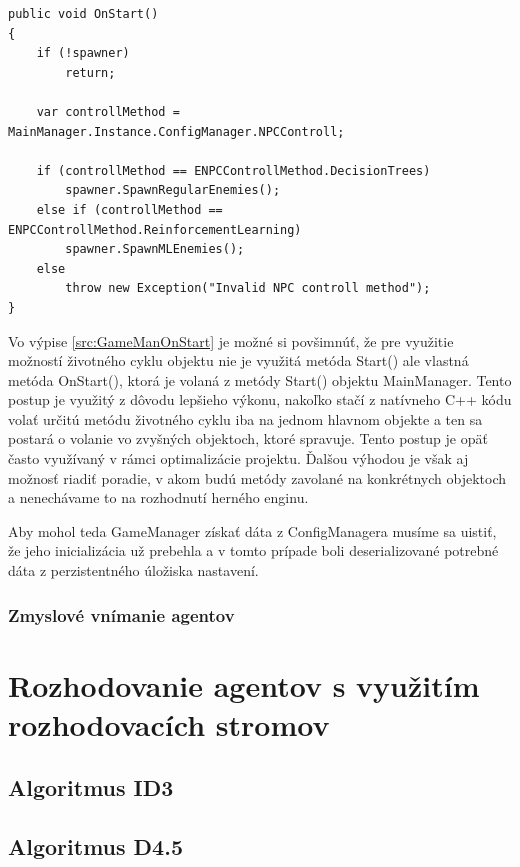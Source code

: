 \documentclass[slovak, master]{diploma}
\begin{document}
\vspace{8pt}
\begin{lstlisting}[label=src:GameManOnStart,caption={Inštancovanie NPC agentov na základe nastavení}]
public void OnStart() 
{
    if (!spawner)
        return;

    var controllMethod = MainManager.Instance.ConfigManager.NPCControll;

    if (controllMethod == ENPCControllMethod.DecisionTrees)
        spawner.SpawnRegularEnemies();
    else if (controllMethod == ENPCControllMethod.ReinforcementLearning)
        spawner.SpawnMLEnemies();
    else
        throw new Exception("Invalid NPC controll method");
}
\end{lstlisting}

Vo výpise \ref{src:GameManOnStart} je možné si povšimnúť, že pre využitie možností životného cyklu objektu nie je využitá metóda Start() ale vlastná metóda OnStart(), ktorá je volaná z metódy Start() objektu MainManager. Tento postup je využitý z dôvodu lepšieho výkonu, nakoľko stačí z natívneho C++ kódu volať určitú metódu životného cyklu iba na jednom hlavnom objekte a ten sa postará o volanie vo zvyšných objektoch, ktoré spravuje. Tento postup je opäť často využívaný v rámci optimalizácie projektu. Ďalšou výhodou je však aj možnosť riadiť poradie, v akom budú metódy zavolané na konkrétnych objektoch a nenechávame to na rozhodnutí herného enginu. 

Aby mohol teda GameManager získať dáta z ConfigManagera musíme sa uistiť, že jeho inicializácia už prebehla a v tomto prípade boli deserializované potrebné dáta z perzistentného úložiska nastavení. 

\subsection{Zmyslové vnímanie agentov}
\label{sec:Perception}

\chapter{Rozhodovanie agentov s využitím rozhodovacích stromov}
\label{sec:ImplDecisionTrees}
\section{Algoritmus ID3}
\label{sec:ID3}
\section{Algoritmus D4.5}
\label{sec:D45}
\end{document}
